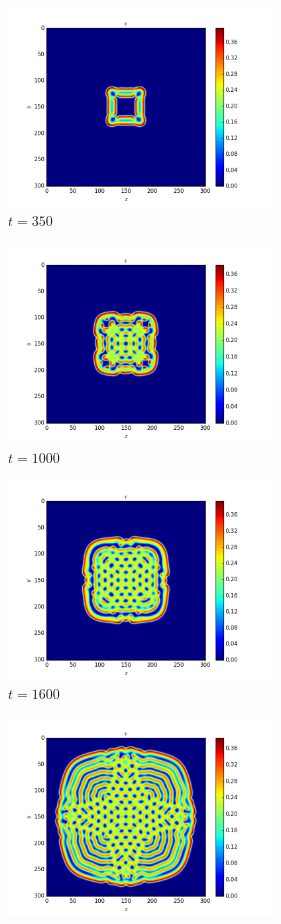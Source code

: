 \documentclass[a4paper]{article}
\begin{document}
\begin{figure}[ht]
  \begin{subfigure}[b]{0.5\linewidth}
    \centering
    \includegraphics[width=7cm]{gs2_350}
    \caption{$t = 350$}
    \label{fig:gs2_350}
  \end{subfigure}%
  \begin{subfigure}[b]{0.5\linewidth}
    \centering
    \includegraphics[width=7cm]{gs2_1000}
    \caption{$t = 1000$}
    \label{fig:gs2_1000}
  \end{subfigure}
  \begin{subfigure}[b]{0.5\linewidth}
    \centering
    \includegraphics[width=7cm]{gs2_1600}
    \caption{$t = 1600$}
    \label{fig:gs2_1600}
  \end{subfigure}%
  \begin{subfigure}[b]{0.5\linewidth}
    \centering
    \includegraphics[width=7cm]{gs2_3000}

\end{subfigure}
\end{figure}
\end{document}

